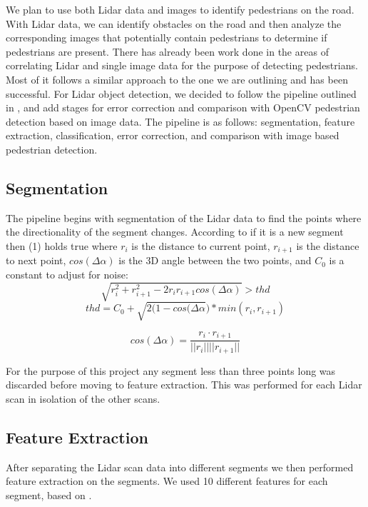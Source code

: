 \documentclass[10pt,twocolumn,letterpaper]{article}
\begin{document}
  We plan to use both Lidar data and images to identify
  pedestrians on the road. With Lidar data, we can identify obstacles on the
  road and then analyze the corresponding images that potentially contain
  pedestrians to determine if pedestrians are present. There has already 
  been work done in the areas of correlating
  Lidar and single image data for the purpose of detecting pedestrians. Most
  of it follows a similar approach to the one we are outlining and has been successful.
  For Lidar object detection, we decided to follow the pipeline outlined
  in \cite{journal}, and add stages for error correction and comparison with
  OpenCV \cite{opencv} pedestrian detection based on image data. 
  The pipeline is as follows: segmentation, feature
  extraction, classification, error correction, and comparison with image based
  pedestrian detection.

  \subsection{Segmentation}
  The pipeline begins with segmentation of the Lidar data
  to find the points where the directionality of the segment changes.
  According to \cite{conf} if it
  is a new segment then (1) holds true where $r_i$ is the
  distance to current point, $r_{i+1}$ is the distance to next point,
  $cos(\Delta \alpha)$ is the 3D angle between the two points, and $C_0$ is a
  constant to adjust for noise:
   \begin{equation} \sqrt{r_{i}^{2} + r_{i+1}^{2} - 2 r_{i} r_{i+1}
   cos(\Delta \alpha)} > thd \end{equation}
   \begin{equation} thd = C_0 + \sqrt{2(1-cos(\Delta \alpha}) * min(r_i,
   r_{i+1}) \end{equation}

   \begin{equation}  cos(\Delta \alpha) = \frac{r_i \cdot r_{i+1}}
   {||r_i||||r_{i+1}||} \end{equation}

  For the purpose of this project any segment less than three points long was
  discarded before moving to feature extraction. This was performed for each
  Lidar scan in isolation of the other scans.

  \subsection{Feature Extraction}
  After separating the Lidar scan data into different segments we then
  performed feature extraction on the segments. We used 10 different features
  for each segment, based on \cite{journal}.
\end{document}
